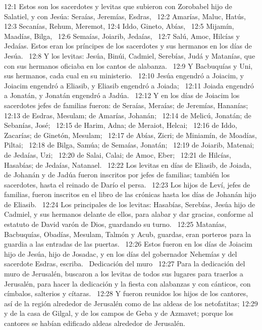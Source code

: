 12:1 Estos son los sacerdotes y levitas que subieron con Zorobabel hijo de Salatiel, y con Jesúa: Seraías, Jeremías, Esdras,  
12:2 Amarías, Maluc, Hatús,  
12:3 Secanías, Rehum, Meremot, 
12:4 Iddo, Gineto, Abías,  
12:5 Mijamín, Maadías, Bilga,  
12:6 Semaías, Joiarib, Jedaías,  
12:7 Salú, Amoc, Hilcías y Jedaías. Estos eran los príncipes de los sacerdotes y sus hermanos en los días de Jesúa.  
12:8 Y los levitas: Jesúa, Binúi, Cadmiel, Serebías, Judá y Matanías, que con sus hermanos oficiaba en los cantos de alabanza.  
12:9 Y Bacbuquías y Uni, sus hermanos, cada cual en su ministerio.  
12:10 Jesúa engendró a Joiacim, y Joiacim engendró a Eliasib, y Eliasib engendró a Joiada;  
12:11 Joiada engendró a Jonatán, y Jonatán engendró a Jadúa.  
12:12 Y en los días de Joiacim los sacerdotes jefes de familias fueron: de Seraías, Meraías; de Jeremías, Hananías;  
12:13 de Esdras, Mesulam; de Amarías, Johanán;  
12:14 de Melicú, Jonatán; de Sebanías, José;  
12:15 de Harim, Adna; de Meraiot, Helcai;  
12:16 de Iddo, Zacarías; de Ginetón, Mesulam;  
12:17 de Abías, Zicri; de Miniamín, de Moadías, Piltai;  
12:18 de Bilga, Samúa; de Semaías, Jonatán;  
12:19 de Joiarib, Matenai; de Jedaías, Uzi;  
12:20 de Salai, Calai; de Amoc, Eber;  
12:21 de Hilcías, Hasabías; de Jedaías, Natanael.  
12:22 Los levitas en días de Eliasib, de Joiada, de Johanán y de Jadúa fueron inscritos por jefes de familias; también los sacerdotes, hasta el reinado de Darío el persa.  
12:23 Los hijos de Leví, jefes de familias, fueron inscritos en el libro de las crónicas hasta los días de Johanán hijo de Eliasib.  
12:24 Los principales de los levitas: Hasabías, Serebías, Jesúa hijo de Cadmiel, y sus hermanos delante de ellos, para alabar y dar gracias, conforme al estatuto de David varón de Dios, guardando su turno.  
12:25 Matanías, Bacbuquías, Obadías, Mesulam, Talmón y Acub, guardas, eran porteros para la guardia a las entradas de las puertas.  
12:26 Estos fueron en los días de Joiacim hijo de Jesúa, hijo de Josadac, y en los días del gobernador Nehemías y del sacerdote Esdras, escriba.  
Dedicación del muro  
12:27 Para la dedicación del muro de Jerusalén, buscaron a los levitas de todos sus lugares para traerlos a Jerusalén, para hacer la dedicación y la fiesta con alabanzas y con cánticos, con címbalos, salterios y cítaras.  
12:28 Y fueron reunidos los hijos de los cantores, así de la región alrededor de Jerusalén como de las aldeas de los netofatitas; 
12:29 y de la casa de Gilgal, y de los campos de Geba y de Azmavet; porque los cantores se habían edificado aldeas alrededor de Jerusalén.  
